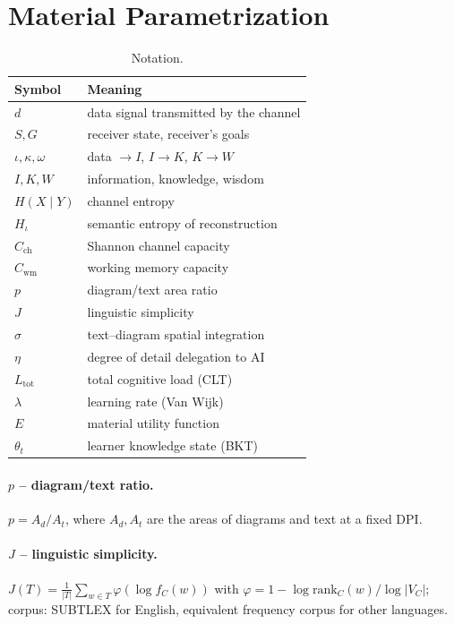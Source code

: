 \documentclass[10pt,a4paper]{article}
\begin{document}
\section{Material Parametrization}

\begin{table}[h]
\centering
\small
\caption{Notation.}
\label{tab:notation}
\begin{tabular}{ll}
\hline
Symbol & Meaning \\
\hline
$d$ & data signal transmitted by the channel \\
$S, G$ & receiver state, receiver's goals \\
$\iota, \kappa, \omega$ & data $\to I$, $I \to K$, $K \to W$ \\
$I, K, W$ & information, knowledge, wisdom \\
$H(X\mid Y)$ & channel entropy \\
$H_{\iota}$ & semantic entropy of reconstruction \\
$C_{\text{ch}}$ & Shannon channel capacity \\
$C_{\text{wm}}$ & working memory capacity \\
$p$ & diagram/text area ratio \\
$J$ & linguistic simplicity \\
$\sigma$ & text--diagram spatial integration \\
$\eta$ & degree of detail delegation to AI \\
$L_{\text{tot}}$ & total cognitive load (CLT) \\
$\lambda$ & learning rate (Van Wijk) \\
$E$ & material utility function \\
$\theta_t$ & learner knowledge state (BKT) \\
\hline
\end{tabular}
\end{table}

\paragraph{$p$ – diagram/text ratio.}
$p = A_d / A_t$, where $A_d, A_t$ are the areas of diagrams and text at
a fixed DPI.

\paragraph{$J$ – linguistic simplicity.}
$J(T) = \frac{1}{|T|}\sum_{w \in T} \varphi(\log f_C(w))$ with
$\varphi = 1 - \log\mathrm{rank}_C(w)/\log|V_C|$; corpus:
SUBTLEX for English, equivalent frequency corpus for other languages.
\end{document}
